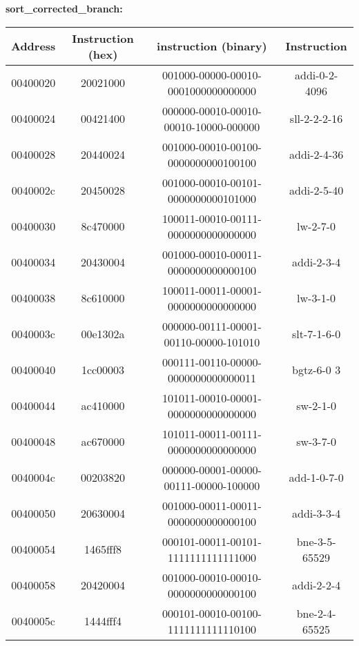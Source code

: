 \documentclass[11pt]{article}   	%
\begin{document}
\textbf{sort\_corrected\_branch:}

\begin{table}[!htbp]

\begin{tabular}{|c|c|c|c|}
\hline
Address & Instruction (hex) & instruction (binary)  &  Instruction \\
\hline
00400020 & 20021000 & 001000-00000-00010-0001000000000000 & addi-0-2-4096  \\
\hline
00400024 & 00421400 & 000000-00010-00010-00010-10000-000000 & sll-2-2-2-16   \\
\hline
00400028 & 20440024 & 001000-00010-00100-0000000000100100 & addi-2-4-36 \\
\hline
0040002c & 20450028 & 001000-00010-00101-0000000000101000 & addi-2-5-40   \\
\hline
00400030 & 8c470000 & 100011-00010-00111-0000000000000000 & lw-2-7-0   \\
\hline
00400034 & 20430004 & 001000-00010-00011-0000000000000100 & addi-2-3-4   \\
\hline
00400038 & 8c610000& 100011-00011-00001-0000000000000000 & lw-3-1-0 \\
\hline
0040003c & 00e1302a & 000000-00111-00001-00110-00000-101010 & slt-7-1-6-0    \\
\hline
00400040 & 1cc00003 & 000111-00110-00000-0000000000000011 &  bgtz-6-0 3   \\
\hline
00400044 & ac410000 & 101011-00010-00001-0000000000000000 & sw-2-1-0    \\
\hline
00400048 & ac670000 & 101011-00011-00111-0000000000000000 & sw-3-7-0  \\
\hline
0040004c & 00203820 & 000000-00001-00000-00111-00000-100000 & add-1-0-7-0  \\
\hline
00400050 & 20630004 & 001000-00011-00011-0000000000000100 & addi-3-3-4  \\
\hline
00400054 & 1465fff8 & 000101-00011-00101-1111111111111000 &bne-3-5-65529   \\
\hline
00400058 & 20420004 & 001000-00010-00010-0000000000000100 & addi-2-2-4   \\
\hline
0040005c & 1444fff4 & 000101-00010-00100-1111111111110100 & bne-2-4-65525 \\
\hline
\end{tabular}
\end{table}
\end{document}
